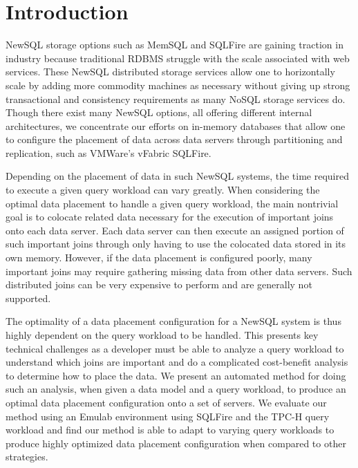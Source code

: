 \section{Introduction}
\label{sec:intro}

NewSQL storage options such as MemSQL and SQLFire are gaining traction in industry because traditional RDBMS struggle with the scale associated with web services.  These NewSQL distributed storage services allow one to horizontally scale by adding more commodity machines as necessary without giving up strong transactional and consistency requirements as many NoSQL storage services do.  Though there exist many NewSQL options, all offering different internal architectures, we concentrate our efforts on in-memory databases that allow one to configure the placement of data across data servers through partitioning and replication, such as VMWare's vFabric SQLFire.

Depending on the placement of data in such NewSQL systems, the time required to execute a given query workload can vary greatly.  When considering the optimal data placement to handle a given query workload, the main nontrivial goal is to colocate related data necessary for the execution of important joins onto each data server.  Each data server can then execute an assigned portion of such important joins through only having to use the colocated data stored in its own memory.  However, if the data placement is configured poorly, many important joins may require gathering missing data from other data servers.  Such distributed joins can be very expensive to perform and are generally not supported.

The optimality of a data placement configuration for a NewSQL system is thus highly dependent on the query workload to be handled.  This presents key technical challenges as a developer must be able to analyze a query workload to understand which joins are important and do a complicated cost-benefit analysis to determine how to place the data.  We present an automated method for doing such an analysis, when given a data model and a query workload, to produce an optimal data placement configuration onto a set of servers.  We evaluate our method using an Emulab environment using SQLFire and the TPC-H query workload and find our method is able to adapt to varying query workloads to produce highly optimized data placement configuration when compared to other strategies.
